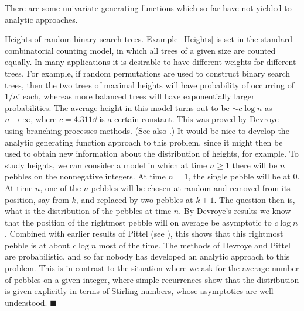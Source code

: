 There are some univariate generating functions which so far have not yielded
to analytic approaches.
\begin{exam}
\label{HRandom}
Heights of random binary search trees.
{\rm Example~\ref{Heights} is set in the standard combinatorial
counting model, in which all trees of a given size are counted
equally.
In many applications it is desirable to have different weights
for different trees.
For example, if random permutations are used to construct binary
search trees, then the two trees of maximal heights will have probability of occurring of $1/n!$ each, whereas more balanced trees will have exponentially
larger probabilities.
The average height in this model turns out to be $\sim c \log n$
as $n \to \infty$, where $c=4.311 \dd$ is a certain constant.
This was proved by Devroye \cite{Devroye86,Devroye87} using branching
processes methods.
(See also \cite{Mahmoud}.)
It would be nice to develop the analytic generating
function approach to this problem, since it might then be used to obtain new information about the distribution of heights, for example.
To study heights, we can consider a model in which at time $n \ge 1$
there will be $n$ pebbles on the nonnegative integers.
At time $n=1$, the single pebble will be at 0.
At time $n$, one of the $n$ pebbles will be chosen at random and removed from its position,
say from $k$, and replaced by two pebbles at $k+1$.
The question then is, what is the distribution of the pebbles
at time $n$.
By Devroye's results we know that the position of the rightmost pebble will on average be asymptotic to $c \log n$.
Combined with earlier results of Pittel (see \cite{Mahmoud}),
this shows that this rightmost pebble is at about $c \log n$ most of the time.
The methods of Devroye and Pittel are probabilistic,
and so far nobody has developed an analytic approach to this problem.
This is in contrast to the situation where we ask for the average number of pebbles on a given integer,
where simple recurrences show that the distribution is given explicitly
in terms of Stirling numbers, whose asymptotics are well understood. \hfill $\blacksquare$
}
\end{exam}

